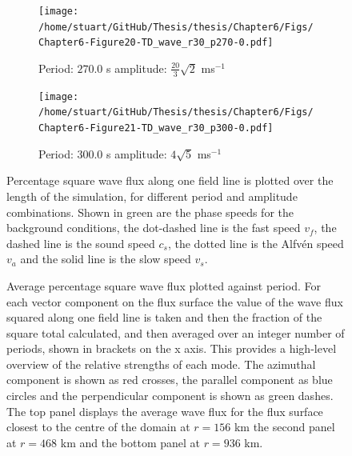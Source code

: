 \documentclass[a4paper,12pt,fourier,authoryear,custommargin]{Classes/PhDThesisPSnPDF}
\begin{document}
\begin{figure}
    \centering
\ContinuedFloat
    

    \begin{subfigure}[b]{0.79\columnwidth}
        \texttt{[image: /home/stuart/GitHub/Thesis/thesis/Chapter6/Figs/Chapter6-Figure20-TD\_wave\_r30\_p270-0.pdf]}
        \caption{Period: $270.0$ s amplitude: $\frac{20}{3}\sqrt{2}$ ms$^{{-1}}$}
        \label{fig:TD-wave-r30-p270-0}
    \end{subfigure}

    \begin{subfigure}[b]{0.79\columnwidth}
        \texttt{[image: /home/stuart/GitHub/Thesis/thesis/Chapter6/Figs/Chapter6-Figure21-TD\_wave\_r30\_p300-0.pdf]}
        \caption{Period: $300.0$ s amplitude: $4\sqrt{5}$ ms$^{{-1}}$}
        \label{fig:TD-wave-r30-p300-0}
    \end{subfigure}
    \caption{Percentage square wave flux along one field line is plotted over the length of the simulation, for different period and amplitude combinations. Shown in green are the phase speeds for the background conditions, the dot-dashed line is the fast speed $v_f$, the dashed line is the sound speed $c_s$, the dotted line is the Alfv\'en speed $v_a$ and the solid line is the slow speed $v_s$.}
    \label{fig:TD-fwave-r30-c}
\end{figure}




\begin{figure}[h]
    \centering
    \caption{Average percentage square wave flux plotted against period. For each vector component on the flux surface the value of the wave flux squared along one field line is taken and then the fraction of the square total calculated, and then averaged over an integer number of periods, shown in brackets on the x axis. This provides a high-level overview of the relative strengths of each mode. The azimuthal component is shown as red crosses, the parallel component as blue circles and the perpendicular component is shown as green dashes. The top panel displays the average wave flux for the flux surface closest to the centre of the domain at $r=156$ km the second panel at $r=468$ km and the bottom panel at $r=936$ km.}
    \label{fig:period-flux}
\end{figure}
\end{document}

